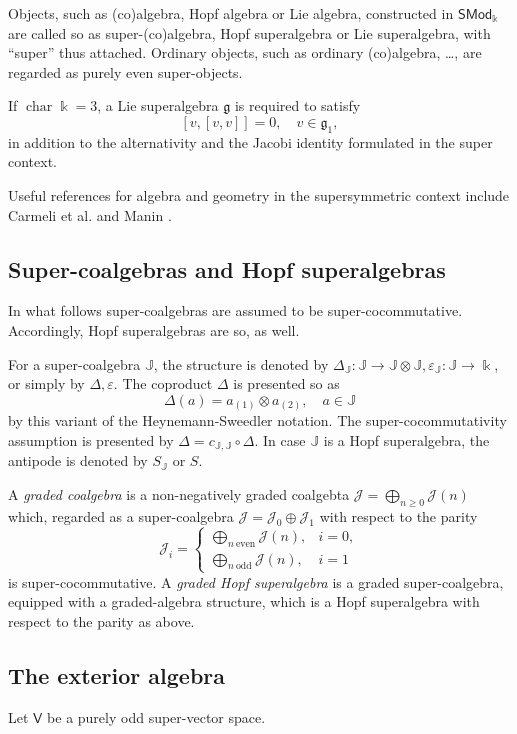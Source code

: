 \documentclass[11pt, a4paper]{amsart}
\theoremstyle{definition}
\numberwithin{equation}{section}
\begin{document}
Objects, such as (co)algebra, Hopf algebra or Lie algebra, constructed in $\mathsf{SMod}_{\Bbbk}$ are called so as super-(co)algebra, Hopf superalgebra or Lie superalgebra, with ``super'' thus attached.
Ordinary objects, such as ordinary (co)algebra, \dots, are regarded as purely even super-objects.

If $\operatorname{char} \Bbbk = 3$, a Lie superalgebra $\mathfrak{g}$ is required to satisfy
\[ [v,[v,v]] = 0,\quad v \in \mathfrak{g}_{1}, \]
in addition to the alternativity and the Jacobi identity formulated in the super context.

Useful references for algebra and geometry in the supersymmetric context include Carmeli et al. \cite{CCF} and Manin \cite{Manin}. 

\subsection{Super-coalgebras and Hopf superalgebras}\label{Subsec2.2}
In what follows super-coalgebras are assumed to be super-cocommutative.
Accordingly, Hopf superalgebras are so, as well.

For a super-coalgebra $\mathbb{J}$, the structure is denoted by $\Delta_{\mathbb{J}}: \mathbb{J} \to \mathbb{J} \otimes \mathbb{J}, \varepsilon_{\mathbb{J}}: \mathbb{J} \to \Bbbk$, or simply by $\Delta, \varepsilon$.
The coproduct $\Delta$ is presented so as
\[ \Delta(a) = a_{(1)} \otimes a_{(2)},\quad a \in \mathbb{J} \]
by this variant of the Heynemann-Sweedler notation.
The super-cocommutativity assumption is presented by $\Delta = c_{\mathbb{J}, \mathbb{J}} \circ \Delta$.
In case $\mathbb{J}$ is a Hopf superalgebra, the antipode is denoted by $S_{\mathbb{J}}$ or $S$.

A \emph{graded coalgebra} is a non-negatively graded coalgebta $\mathcal{J} = \bigoplus_{n \geq 0} \mathcal{J}(n)$ which, regarded as a super-coalgebra $\mathcal{J} = \mathcal{J}_{0} \oplus \mathcal{J}_{1}$ with respect to the parity
\[
\mathcal{J}_{i} = \left\{
\begin{array}{cl}
\bigoplus\limits_{n~\mathrm{even}} \mathcal{J}(n), & i=0, \\
\bigoplus\limits_{n~\mathrm{odd}} \mathcal{J}(n), & i=1
\end{array}
\right.
\]
is super-cocommutative.
A \emph{graded Hopf superalgebra} is a graded super-coalgebra, equipped with a graded-algebra structure, which is a Hopf superalgebra with respect to the parity as above.


\subsection{The exterior algebra}\label{Subsec2.3}
Let $\mathsf{V}$ be a purely odd super-vector space.
\end{document}
